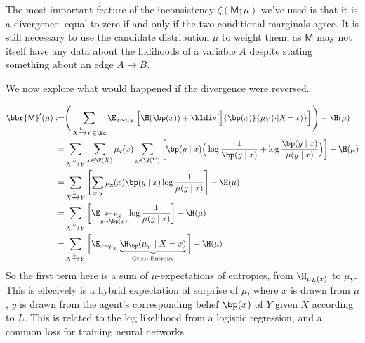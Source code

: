 \documentclass{article}
\newcommand{\sfM}{\mathsf M}
\begin{document}
	The most important feature of the inconsistency $\zeta(\sfM ; \mu)$ we've used is that it is a divergence: equal to zero if and only if the two conditional marginals agree. It is still necessary to use the candidate distribution $\mu$ to weight them, as $\sfM$ may not itself have any data about the liklihoods of a variable $A$ despite stating something about an edge $A \to B$.

	We now explore what would happened if the divergence were reversed.

	\begin{align*}
		 \bbr{\sfM}'(\mu) :=& \Bigg(\sum_{ X \xrightarrow{\!\!L} Y  \in \Ed } \E_{x \sim \mu_X}  \left[ \H (\bp (x)) +\kldiv[\Big]{\bp(x) }{ \mu_Y(\cdot | X \!=\! x) }  \right] \Bigg) - \H(\mu) \\
		 =& \sum_{ X \xrightarrow{\!\!L} Y } \sum_{x \in \V(X)} \mu_{\!_X}\!(x) \sum_{y \in \V(Y)}  \left[ \bp (y\mid x) \Big(\log \frac{1}{\bp(y \mid x)} + \log \frac{\bp(y \mid x)}{\mu(y \mid x)}\Big)  \right]  - \H(\mu) \\
		 =& \sum_{ X \xrightarrow{\!\!L} Y} \left[ \sum_{x, y }   \mu_{\!_X}\!(x) \bp (y\mid x) \log \frac{1}{\mu(y \mid x)}  \right]  - \H(\mu) \\
		 =& \sum_{ X \xrightarrow{\!\!L} Y} \bigg[ \E_{\substack{x \sim \mu_{\!_X} \\[-0.0em] y \sim \bp(x)}} \log \frac{1}{\mu(y \mid x)}  \bigg]  - \H(\mu) \\
		 =& \sum_{ X \xrightarrow{\!\!L} Y} \bigg[ \E_{x \sim \mu_{\!_X}} \underbrace{ \H_{\bp} (\mu_{_Y} \mid X = x)}_{\text{Cross Entropy}}  \bigg]  - \H(\mu ) \\
	\end{align*}
	So the first term here is a sum of $\mu$-expectations of entropies, from $\H_{\mu_L(x)}$ to $\mu_Y$.
	This is effecively is a hybrid expectation of surprise of $\mu$, where $x$ is drawn from $\mu$, $y$ is drawn from the agent's corresponding belief $\bp(x)$ of $Y$ given $X$ according to $L$. This is related to the log likelihood from a logistic regression, and a common loss for training neural networks


\end{document}
